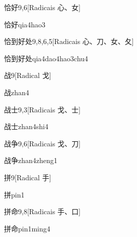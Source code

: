 \begin{entry}{恰好}{9,6}[Radicais ⼼、⼥]
  \begin{phonetics}{恰好}{qia4hao3}
  \end{phonetics}
\end{entry}

\begin{entry}{恰到好处}{9,8,6,5}[Radicais ⼼、⼑、⼥、⼡]
  \begin{phonetics}{恰到好处}{qia4dao4hao3chu4}
  \end{phonetics}
\end{entry}

\begin{entry}{战}{9}[Radical ⼽]
  \begin{phonetics}{战}{zhan4}
  \end{phonetics}
\end{entry}

\begin{entry}{战士}{9,3}[Radicais ⼽、⼠]
  \begin{phonetics}{战士}{zhan4shi4}
  \end{phonetics}
\end{entry}

\begin{entry}{战争}{9,6}[Radicais ⼽、⼑]
  \begin{phonetics}{战争}{zhan4zheng1}
  \end{phonetics}
\end{entry}

\begin{entry}{拼}{9}[Radical ⼿]
  \begin{phonetics}{拼}{pin1}
  \end{phonetics}
\end{entry}

\begin{entry}{拼命}{9,8}[Radicais ⼿、⼝]
  \begin{phonetics}{拼命}{pin1ming4}
  \end{phonetics}
\end{entry}

